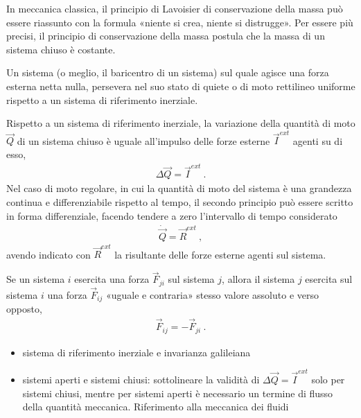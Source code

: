 \documentclass[letterpaper,10pt,italian]{jupyterBook}
\begin{document}
\sphinxAtStartPar
{} In meccanica classica, il principio di Lavoisier di conservazione della massa può essere riassunto con la formula «niente si crea, niente si distrugge». Per essere più precisi, il principio di conservazione della massa postula che la massa di un sistema chiuso è costante.

\sphinxAtStartPar
{} Un sistema (o meglio, il baricentro di un sistema) sul quale agisce una forza esterna netta nulla, persevera nel suo stato di quiete o di moto rettilineo uniforme rispetto a un sistema di riferimento inerziale.

\sphinxAtStartPar
{} Rispetto a un sistema di riferimento inerziale, la variazione della quantità di moto \(\vec{Q}\) di un sistema chiuso è uguale all’impulso delle forze esterne \(\vec{I}^{ext}\) agenti su di esso,
\begin{equation*}
\begin{split}\Delta \vec{Q} = \vec{I}^{ext} \ .\end{split}
\end{equation*}
\sphinxAtStartPar
Nel caso di moto regolare, in cui la quantità di moto del sistema è una grandezza continua e differenziabile rispetto al tempo, il secondo principio può essere scritto in forma differenziale, facendo tendere a zero l’intervallo di tempo considerato
\begin{equation*}
\begin{split}\dot{\vec{Q}} = \vec{R}^{ext} \ ,\end{split}
\end{equation*}
\sphinxAtStartPar
avendo indicato con \(\vec{R}^{ext}\) la risultante delle forze esterne agenti sul sistema.

\sphinxAtStartPar
{} Se un sistema \(i\) esercita una forza \(\vec{F}_{ji}\) sul sistema \(j\), allora il sistema \(j\) esercita sul sistema \(i\) una forza \(\vec{F}_{ij}\) «uguale e contraria» \sphinxhyphen{} stesso valore assoluto e verso opposto,
\begin{equation*}
\begin{split}\vec{F}_{ij} = - \vec{F}_{ji} \ .\end{split}
\end{equation*}
\sphinxAtStartPar
{} 
\begin{itemize}
\item {} 
\sphinxAtStartPar
sistema di riferimento inerziale e invarianza galileiana

\item {} 
\sphinxAtStartPar
sistemi aperti e sistemi chiusi: sottolineare la validità di \(\Delta \vec{Q} = \vec{I}^{ext}\) solo per sistemi chiusi, mentre per sistemi aperti è necessario un termine di flusso della quantità meccanica. Riferimento alla meccanica dei fluidi

\end{itemize}
\end{document}
